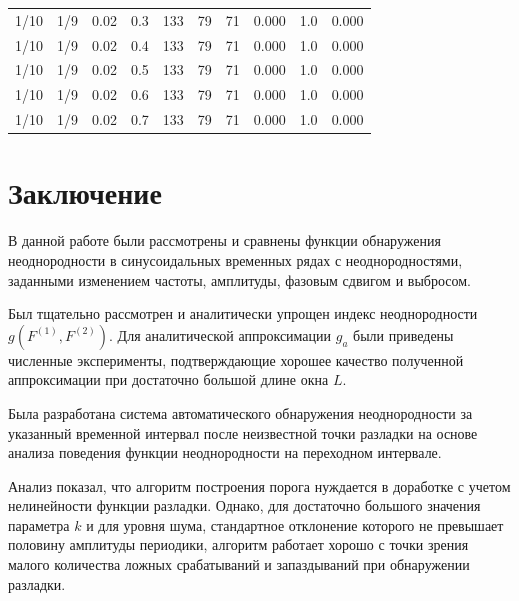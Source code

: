\documentclass[specialist, substylefile = spbu.rtx,
			   subf, href, 12pt]{disser}
\begin{document}
\begin{table}[!hhh]
\begin{tabular}{cccccccccc}
		1/10 &   1/9 &     0.02 &     0.3 & 133 & 79 & 71 & 0.000 & 1.0 & 0.000 \\
		1/10 &   1/9 &     0.02 &     0.4 & 133 & 79 & 71 & 0.000 & 1.0 & 0.000 \\
		1/10 &   1/9 &     0.02 &     0.5 & 133 & 79 & 71 & 0.000 & 1.0 & 0.000 \\
		1/10 &   1/9 &     0.02 &     0.6 & 133 & 79 & 71 & 0.000 & 1.0 & 0.000 \\
		1/10 &   1/9 &     0.02 &     0.7 & 133 & 79 & 71 & 0.000 & 1.0 & 0.000 \\
		\bottomrule
	\end{tabular}
	\label{tab:simplified_system_results_k=45_2}
\end{table}

\newpage
\chapter*{Заключение}

В данной работе были рассмотрены и сравнены функции обнаружения неоднородности в синусоидальных временных рядах с неоднородностями, заданными изменением частоты, амплитуды, фазовым сдвигом и выбросом. 

Был тщательно рассмотрен и аналитически упрощен индекс неоднородности \newline $ g(F^{(1)}, F^{(2)}) $. Для аналитической аппроксимации $ g_a $ были приведены численные эксперименты, подтверждающие хорошее качество полученной аппроксимации при достаточно большой длине окна $L$.

Была разработана система автоматического обнаружения неоднородности за указанный временной интервал после неизвестной точки разладки на основе анализа поведения функции неоднородности на переходном интервале.

Анализ показал, что алгоритм построения порога нуждается в доработке с учетом нелинейности функции разладки. Однако, для достаточно большого значения параметра $ k $ и для уровня шума, стандартное отклонение которого не превышает половину амплитуды периодики, алгоритм работает хорошо с точки зрения малого количества ложных срабатываний и запаздываний при обнаружении разладки.




\end{document}
